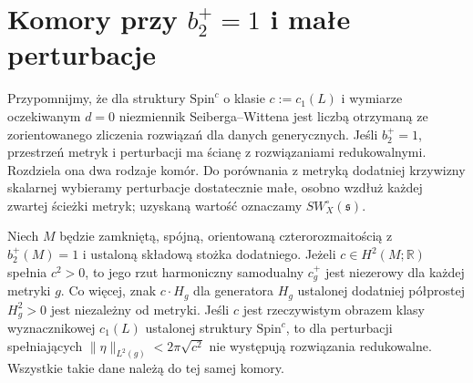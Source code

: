 \section{Komory przy \texorpdfstring{$b_2^+=1$}{b2+=1} i małe perturbacje}
\label{sec:tg-park14-chamber}

Przypomnijmy, że dla struktury $\mathrm{Spin}^c$ o klasie
$c:=c_1(L)$ i wymiarze oczekiwanym $d=0$ niezmiennik
Seiberga--Wittena jest liczbą otrzymaną ze zorientowanego
zliczenia rozwiązań dla danych generycznych. Jeśli $b_2^+=1$,
przestrzeń metryk i perturbacji ma ścianę z rozwiązaniami
redukowalnymi. Rozdziela ona dwa rodzaje komór.
Do porównania z metryką dodatniej krzywizny skalarnej
wybieramy perturbacje dostatecznie małe, osobno wzdłuż
każdej zwartej ścieżki metryk; uzyskaną wartość oznaczamy
$SW^{\circ}_X(\mathfrak s)$.

\begin{lemat}
\label{lem:tg-park14-no-wall}
Niech $M$ będzie zamkniętą, spójną, orientowaną
czterorozmaitością z $b_2^+(M)=1$ i ustaloną składową
stożka dodatniego. Jeżeli $c\in H^2(M;\mathbb R)$
spełnia $c^2>0$, to jego rzut harmoniczny samodualny
$c_g^+$ jest niezerowy dla każdej metryki $g$.
Co więcej, znak $c\cdot H_g$ dla generatora $H_g$
ustalonej dodatniej półprostej $H_g^2>0$ jest niezależny
od metryki. Jeśli $c$ jest rzeczywistym obrazem klasy wyznacznikowej
$c_1(L)$ ustalonej struktury $\mathrm{Spin}^c$, to
dla perturbacji spełniających
$\|\eta\|_{L^2(g)}<2\pi\sqrt{c^2}$ nie występują
rozwiązania redukowalne. Wszystkie takie dane
należą do tej samej komory.
\end{lemat}

